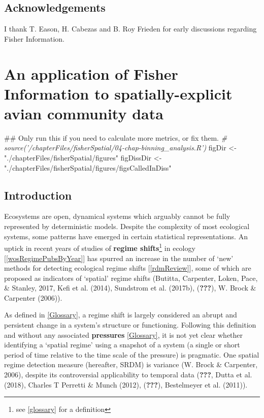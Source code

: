 \documentclass[12pt,twoside,openany]{reedthesis}
\newenvironment{Shaded}{\begin{snugshade}}{\end{snugshade}}
\newcommand{\StringTok}[1]{\textcolor[rgb]{0.31,0.60,0.02}{#1}}
\newcommand{\CommentTok}[1]{\textcolor[rgb]{0.56,0.35,0.01}{\textit{#1}}}
\newcommand{\NormalTok}[1]{#1}
\begin{document}
\section{Acknowledgements}\label{acknowledgements}

I thank T. Eason, H. Cabezas and B. Roy Frieden for early discussions
regarding Fisher Information.

\chapter{An application of Fisher Information to spatially-explicit
avian community data}\label{fisherSpatial}
\begin{Shaded}
\begin{Highlighting}[]
\NormalTok{## Only run this if you need to calculate more metrics, or fix them.}
\CommentTok{# source('/chapterFiles/fisherSpatial/04-chap-binning_analysis.R')}
\NormalTok{figDir <-}\StringTok{ "./chapterFiles/fisherSpatial/figures"}
\NormalTok{figDissDir <-}\StringTok{ "./chapterFiles/fisherSpatial/figures/figsCalledInDiss"}
\end{Highlighting}
\end{Shaded}
\section{Introduction}\label{introduction-2}

Ecosystems are open, dynamical systems which arguably cannot be fully
represented by deterministic models. Despite the complexity of most
ecological systems, some patterns have emerged in certain statistical
representations. An uptick in recent years of studies of \textbf{regime
shifts}\footnote{see \ref{glossary} for a definition} in ecology
{[}\ref{wosRegimePubsByYear}{]} has spurred an increase in the number of
`new' methods for detecting ecological regime shifts
{[}\ref{rdmReview}{]}, some of which are proposed as indicators of
`spatial' regime shifts (Butitta, Carpenter, Loken, Pace, \& Stanley,
2017, Kefi et al. (2014), Sundstrom et al. (2017b), ({\textbf{???}}), W.
Brock \& Carpenter (2006)).

As defined in \ref{Glossary}, a regime shift is largely considered an
abrupt and persistent change in a system's structure or functioning.
Following this definition and without any associated \textbf{pressures}
\ref{Glossary}, it is not yet clear whether identifying a `spatial
regime' using a snapshot of a system (a single or short period of time
relative to the time scale of the pressure) is pragmatic. One spatial
regime detection measure (hereafter, SRDM) is variance (W. Brock \&
Carpenter, 2006), despite its controversial applicability to temporal
data ({\textbf{???}}, Dutta et al. (2018), Charles T Perretti \& Munch
(2012), ({\textbf{???}}), Bestelmeyer et al. (2011)).
\end{document}
